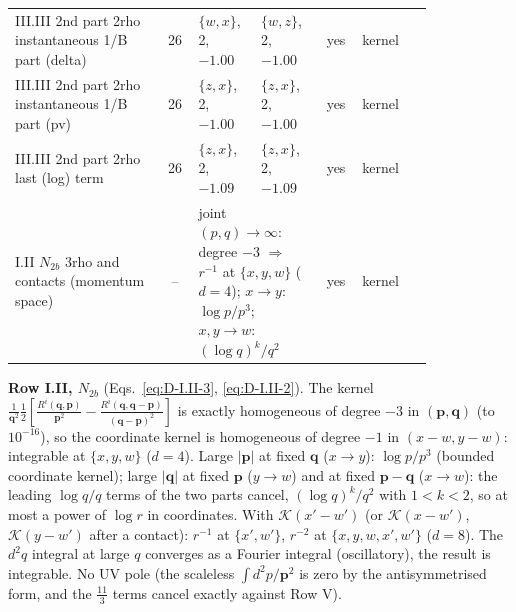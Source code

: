 \documentclass[9pt]{article}
\numberwithin{equation}{section}
\begin{document}
{\begin{center}
\begin{tabular}{|p{0.36\linewidth}|c|p{0.15\linewidth}|p{0.15\linewidth}|c|p{0.17\linewidth}|}
III.III 2nd part 2rho instantaneous 1/B part (delta) & 26 & $\{w,x\}$, 2, $-1.00$ & $\{w,z\}$, 2, $-1.00$ & yes & kernel\\
III.III 2nd part 2rho instantaneous 1/B part (pv) & 26 & $\{z,x\}$, 2, $-1.00$ & $\{z,x\}$, 2, $-1.00$ & yes & kernel\\
III.III 2nd part 2rho last (log) term & 26 & $\{z,x\}$, 2, $-1.09$ & $\{z,x\}$, 2, $-1.09$ & yes & kernel\\
I.II $N_{2b}$ 3rho and contacts (momentum space) & -- & \multicolumn{2}{p{0.3\linewidth}|}{joint $(p,q)\to\infty$: degree $-3$ $\Rightarrow$ $r^{-1}$ at $\{x,y,w\}$ ($d=4$); $x\to y$: $\log p/p^3$; $x,y\to w$: $(\log q)^k/q^2$} & yes & kernel\\\hline
\end{tabular}
\end{center}}
\noindent\textbf{Row I.II, $N_{2b}$} (Eqs.~\eqref{eq:D-I.II-3}, \eqref{eq:D-I.II-2}). The kernel $\frac{1}{\mathbf q^2}\frac12[\frac{R^i(\mathbf q,\mathbf p)}{\mathbf p^2}-\frac{R^i(\mathbf q,\mathbf q-\mathbf p)}{(\mathbf q-\mathbf p)^2}]$ is exactly homogeneous of degree $-3$ in $(\mathbf p,\mathbf q)$ (to $10^{-16}$), so the coordinate kernel is homogeneous of degree $-1$ in $(x-w,y-w)$: integrable at $\{x,y,w\}$ ($d=4$). Large $|\mathbf p|$ at fixed $\mathbf q$ ($x\to y$): $\log p/p^3$ (bounded coordinate kernel); large $|\mathbf q|$ at fixed $\mathbf p$ ($y\to w$) and at fixed $\mathbf p-\mathbf q$ ($x\to w$): the leading $\log q/q$ terms of the two parts cancel, $(\log q)^k/q^2$ with $1<k<2$, so at most a power of $\log r$ in coordinates. With $\mathcal K(x'-w')$ (or $\mathcal K(x-w')$, $\mathcal K(y-w')$ after a contact): $r^{-1}$ at $\{x',w'\}$, $r^{-2}$ at $\{x,y,w,x',w'\}$ ($d=8$). The $d^2q$ integral at large $q$ converges as a Fourier integral (oscillatory), the result is integrable. No UV pole (the scaleless $\int d^2p/\mathbf p^2$ is zero by the antisymmetrised form, and the $\frac{11}{3}$ terms cancel exactly against Row V).
\end{document}
